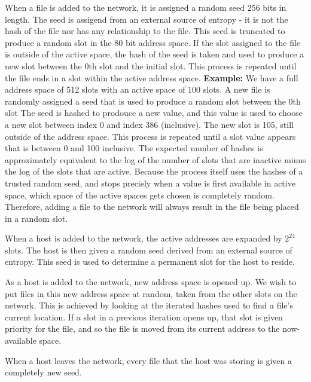 \documentclass[twocolumn]{article}
\begin{document}
When a file is added to the network, it is assigned a random seed 256 bits in length.
The seed is assigend from an external source of entropy - it is not the hash of the file nor has any relationship to the file.
This seed is truncated to produce a random slot in the 80 bit address space.
If the slot assigned to the file is outside of the active space, the hash of the seed is taken and used to produce a new slot between the 0th slot and the initial slot.
This process is repeated until the file ends in a slot within the active address space.
\textbf{Example:} We have a full address space of 512 slots with an active space of 100 slots.
A new file is randomly assigned a seed that is used to produce a random slot between the 0th slot
The seed is hashed to prodouce a new value, and this value is used to choose a new slot between index 0 and index 386 (inclusive).
The new slot is 105, still outside of the address space.
This process is repeated until a slot value appears that is between 0 and 100 inclusive.
The expected number of hashes is approximately equivalent to the log of the number of slots that are inactive minus the log of the slots that are active.
Because the process itself uses the hashes of a trusted random seed, and stops preciely when a value is first available in active space, which space of the active spaces gets chosen is completely random.
Therefore, adding a file to the network will always result in the file being placed in a random slot.

When a host is added to the network, the active addresses are expanded by $2^{24}$ slots.
The host is then given a random seed derived from an external source of entropy.
This seed is used to determine a permanent slot for the host to reside.

As a host is added to the network, new address space is opened up.
We wish to put files in this new address space at random, taken from the other slots on the network.
This is achieved by looking at the iterated hashes used to find a file's current location.
If a slot in a previous iteration opens up, that slot is given priority for the file, and so the file is moved from its current address to the now-available space.

When a host leaves the network, every file that the host was storing is given a completely new seed.
\fi
\end{document}
